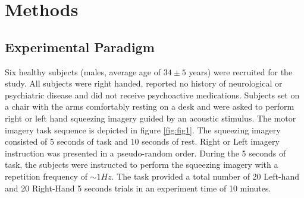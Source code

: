 \documentclass[12pt ]{iopart}
\begin{document}
\section{Methods}
\subsection{Experimental Paradigm}
Six healthy subjects (males, average age of $34\pm5$ years) were recruited for the study. All subjects were right handed, reported no history of neurological or psychiatric disease and did not receive psychoactive medications. 
Subjects set on a chair with the arms comfortably resting on a desk and were asked to perform right or left hand squeezing imagery guided by an acoustic stimulus. The motor imagery task sequence is depicted in figure \ref{fig:fig1}. The 
squeezing imagery consisted of 5 seconds of task and 10 seconds of rest. Right or Left imagery instruction was presented in a pseudo-random order.  During the 5 seconds of task, the subjects were instructed to perform the squeezing imagery with a repetition frequency of $\sim1Hz$. The task provided a total number of 20 Left-hand and 20 Right-Hand 5 seconds trials in an experiment time of 10 minutes. 
\end{document}
